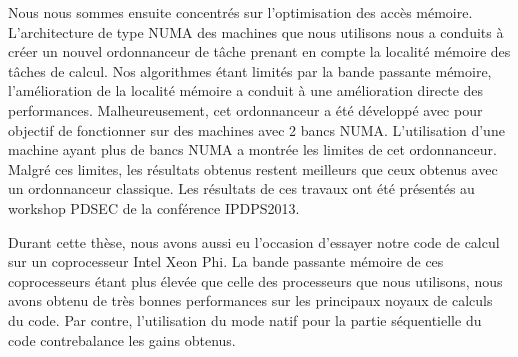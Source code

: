 Nous nous sommes ensuite concentrés sur l'optimisation des accès mémoire.
%
L'architecture de type NUMA des machines que nous utilisons nous a conduits à créer un nouvel ordonnanceur de tâche prenant en compte la localité mémoire des tâches de calcul.
%
Nos algorithmes étant limités par la bande passante mémoire, l'amélioration de la localité mémoire a conduit à une amélioration directe des performances.
%
Malheureusement, cet ordonnanceur a été développé avec pour objectif de fonctionner sur des machines avec 2 bancs NUMA.
%
L'utilisation d'une machine ayant plus de bancs NUMA a montrée les limites de cet ordonnanceur.
%
Malgré ces limites, les résultats obtenus restent meilleurs que ceux obtenus avec un ordonnanceur classique.
%
Les résultats de ces travaux ont été présentés au workshop PDSEC de la conférence IPDPS2013.


Durant cette thèse, nous avons aussi eu l'occasion d'essayer notre code de calcul sur un coprocesseur Intel Xeon Phi.
%
La bande passante mémoire de ces coprocesseurs étant plus élevée que celle des processeurs que nous utilisons, nous avons obtenu de très bonnes performances sur les principaux noyaux de calculs du code.
%
Par contre, l'utilisation du mode natif pour la partie séquentielle du code contrebalance les gains obtenus.
